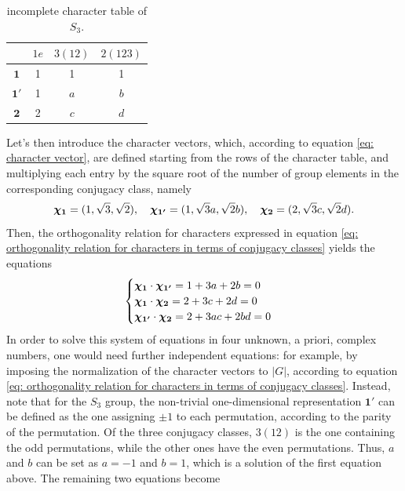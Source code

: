 \begin{ex}
    \begin{table}[h]
        \centering
        \begin{tabular}{|c|ccc|}
             \hline 
             & $1e$ & $3(12)$ & $2(123)$ \\ \hline 
             $\bm{1}$ & 1 & 1 & 1 \\
             $\bm{1'}$ & 1 & $a$ & $b$ \\
             $\bm{2}$ & 2 & $c$ & $d$ \\ \hline 
        \end{tabular}
        \caption{incomplete character table of $S_3$.}
        \label{tab: incomplete character table of S3}
    \end{table}
    
    Let's then introduce the character vectors, which, according to equation \eqref{eq: character vector}, are defined starting from the rows of the character table, and multiplying each entry by the square root of the number of group elements in the corresponding conjugacy class, namely
    \begin{equation}
        \bm{\chi}_{\bm{1}} = (1, \sqrt{3}, \sqrt{2}),\quad \bm{\chi}_{\bm{1'}} = (1, \sqrt{3}a, \sqrt{2}b),\quad \bm{\chi}_{\bm{2}} = (2, \sqrt{3}c, \sqrt{2}d).
    \end{equation}
    Then, the orthogonality relation for characters expressed in equation \eqref{eq: orthogonality relation for characters in terms of conjugacy classes} yields the equations
    \begin{equation}
        \begin{cases}
            \bm{\chi}_{\bm{1}} \cdot \bm{\chi}_{\bm{1'}} = 1 + 3a + 2b = 0 \\
            \bm{\chi}_{\bm{1}} \cdot \bm{\chi}_{\bm{2}} = 2 + 3c + 2d = 0 \\
            \bm{\chi}_{\bm{1'}} \cdot \bm{\chi}_{\bm{2}} = 2 + 3ac + 2bd = 0
        \end{cases}
    \end{equation}
    In order to solve this system of equations in four unknown, a priori, complex numbers, one would need further independent equations: for example, by imposing the normalization of the character vectors to $|G|$, according to equation \eqref{eq: orthogonality relation for characters in terms of conjugacy classes}. Instead, note that for the $S_3$ group, the non-trivial one-dimensional representation $\bm{1'}$ can be defined as the one assigning $\pm 1$ to each permutation, according to the parity of the permutation. Of the three conjugacy classes, $3(12)$ is the one containing the odd permutations, while the other ones have the even permutations. Thus, $a$ and $b$ can be set as $a = -1$ and $b = 1$, which is a solution of the first equation above. The remaining two equations become

\end{ex}
